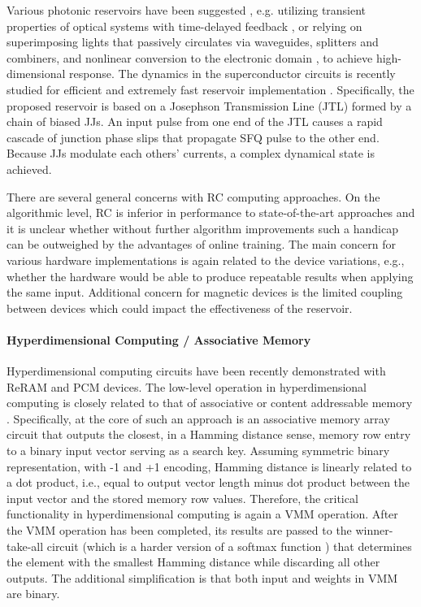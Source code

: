 Various photonic reservoirs have been suggested \cite{Shasti2021}, e.g. utilizing transient properties of optical systems with time-delayed feedback \cite{Bruiner2013}, or relying on superimposing lights that passively circulates via waveguides, splitters and combiners, and nonlinear conversion to the electronic domain \cite{Vandoorne2014}, to achieve high-dimensional response. The dynamics in the superconductor circuits is recently studied for efficient and extremely fast reservoir implementation \cite{Rowlands2021}. Specifically, the proposed reservoir is based on a Josephson Transmission Line (JTL) formed by a chain of biased JJs. An input pulse from one end of the JTL causes a rapid cascade of junction phase slips that propagate SFQ pulse to the other end. Because JJs modulate each others' currents, a complex dynamical state is achieved.

There are several general concerns with RC computing approaches. On the algorithmic level, RC is inferior in performance to state-of-the-art approaches and it is unclear whether without further algorithm improvements such a handicap can be outweighed by the advantages of online training. The main concern for various hardware implementations is again related to the device variations, e.g., whether the hardware would be able to produce repeatable results when applying the same input. Additional concern for magnetic devices is the limited coupling between devices which could impact the effectiveness of the reservoir. 

\paragraph*{Hyperdimensional Computing / Associative Memory}

Hyperdimensional computing \cite{Kanerva2009} circuits have been recently demonstrated with ReRAM \cite{Li2016IEDM} and PCM \cite{Karunaratne2020} devices. The low-level operation in hyperdimensional computing is closely related to that of associative or content addressable memory \cite{Hertz1991}. Specifically, at the core of such an approach is an associative memory array circuit that outputs the closest, in a Hamming distance sense, memory row entry to a binary input vector serving as a search key. Assuming symmetric binary representation, with -1 and +1 encoding, Hamming distance is linearly related to a dot product, i.e., equal to output vector length minus dot product between the input vector and the stored memory row values. Therefore, the critical functionality in hyperdimensional computing is again a VMM operation. After the VMM operation has been completed, its results are passed to the winner-take-all circuit \cite{Hertz1991} (which is a harder version of a softmax function \cite{Bridle1989}) that determines the element with the smallest Hamming distance while discarding all other outputs. The additional simplification is that both input and weights in VMM are binary. 


